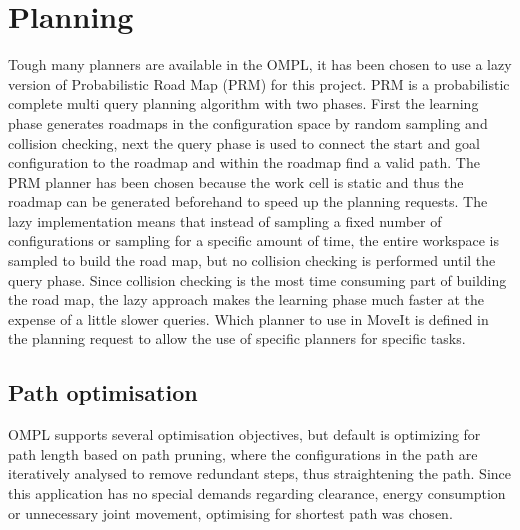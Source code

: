 

\section{Planning}
\label{sec:planning}

Tough many planners are available in the OMPL, it has been chosen to use a lazy version of Probabilistic Road Map (PRM) for this project. PRM is a probabilistic complete multi query planning algorithm with two phases. First the learning phase generates roadmaps in the configuration space by random sampling and collision checking, next the query phase is used to connect the start and goal configuration to the roadmap and within the roadmap find a valid path. The PRM planner has been chosen because the work cell is static and thus the roadmap can be generated beforehand to speed up the planning requests. The lazy implementation means that instead of sampling a fixed number of configurations or sampling for a specific amount of time, the entire workspace is sampled to build the road map, but no collision checking is performed until the query phase. Since collision checking is the most time consuming part of building the road map, the lazy approach makes the learning phase much faster at the expense of a little slower queries. Which planner to use in MoveIt is defined in the planning request to allow the use of specific planners for specific tasks. \\

\subsection{Path optimisation}
OMPL supports several optimisation objectives, but default is optimizing for path length based on path pruning, where the configurations in the path are iteratively analysed to remove redundant steps, thus straightening the path. Since this application has no special demands regarding clearance, energy consumption or unnecessary joint movement, optimising for shortest path was chosen.





